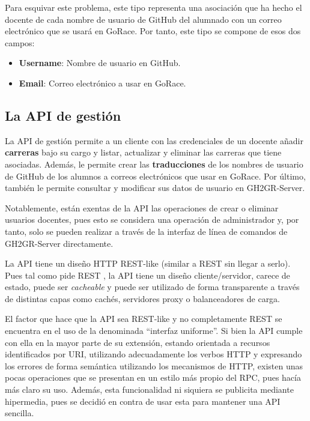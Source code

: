 Para esquivar este problema, este tipo representa una asociación que ha hecho el docente de cada nombre de usuario de GitHub del alumnado con un correo electrónico que se usará en GoRace. Por tanto, este tipo se compone de esos dos campos:

\begin{itemize}
    \item \textbf{Username}: Nombre de usuario en GitHub.
    \item \textbf{Email}: Correo electrónico a usar en GoRace.
\end{itemize}

\subsection{La API de gestión} \label{api-gesion}

La \acrshort{API} de gestión permite a un cliente con las credenciales de un docente añadir {\bf carreras} bajo su cargo y listar, actualizar y eliminar las carreras que tiene asociadas. 
Además, le permite crear las {\bf traducciones} de los nombres de usuario de GitHub de los alumnos a correos electrónicos que usar en GoRace. 
Por último, también le permite consultar y modificar sus datos de usuario en GH2GR-Server. 

Notablemente, están exentas de la \acrshort{API} las operaciones de crear o eliminar usuarios docentes, pues esto se considera una operación de administrador y, por tanto, solo se pueden realizar a través de la interfaz de línea de comandos de GH2GR-Server directamente.

La \acrshort{API} tiene un diseño \acrshort{HTTP} \acrshort{REST}-like (similar a \acrshort{REST} sin llegar a serlo). 
Pues tal como pide \acrshort{REST} \cite{REST}, 
la \acrshort{API} tiene un diseño cliente/servidor, 
carece de estado, puede ser \textit{cacheable} 
y puede ser utilizado de forma transparente a través de distintas capas como cachés, servidores proxy o balanceadores de carga. 

El factor que hace que la \acrshort{API} sea \acrshort{REST}-like y no completamente \acrshort{REST} se encuentra en el uso de la denominada ``interfaz uniforme''. Si bien la \acrshort{API} cumple con ella en la mayor parte de su extensión, estando orientada a recursos identificados por \acrshort{URI}, utilizando adecuadamente los verbos \acrshort{HTTP} y expresando los errores de forma semántica utilizando los mecanismos de \acrshort{HTTP}, existen unas pocas operaciones que se presentan en un estilo más propio del \acrshort{RPC}, pues hacía más claro su uso. Además, esta funcionalidad ni siquiera se publicita mediante hipermedia, pues se decidió en contra de usar esta para mantener una \acrshort{API} sencilla.

